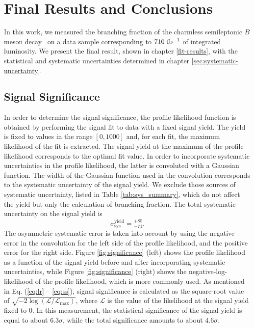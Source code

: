 \chapter{Final Results and Conclusions}\label{sec:results}

In this work, we measured the branching fraction of the charmless semileptonic $B$ meson decay \decayb~on a data sample corresponding to $710\mathrm{~fb^{-1}}$ of integrated luminosity. We present the final result, shown in chapter \ref{fit-results}, with the statistical and systematic uncertainties determined in chapter \ref{sec:systematic-uncertainty}.

\section{Signal Significance}

In order to determine the signal significance, the profile likelihood function is obtained by performing the signal fit to data with a fixed signal yield. The yield is fixed to values in the range $[0, 1000]$ and, for each fit, the maximum likelihood of the fit is extracted. The signal yield at the maximum of the profile likelihood corresponds to the optimal fit value. In order to incorporate systematic uncertainties in the profile likelihood, the latter is convoluted with a Gaussian function. The width of the Gaussian function used in the convolution corresponds to the systematic uncertainty of the signal yield. We exclude those sources of systematic uncertainty, listed in Table \ref{tab:sys_summary}, which do not affect the yield but only the calculation of branching fraction. The total systematic uncertainty on the signal yield is
\begin{equation}
\sigma_{\mathrm{sys}}^{\mathrm{yield}} = {}_{-71}^{+85}.
\end{equation}
The asymmetric systematic error is taken into account by using the negative error in the convolution for the left side of the profile likelihood, and the positive error for the right side. Figure \ref{fig:significance} (left) shows the profile likelihood as a function of the signal yield before and after incorporating systematic uncertainties, while Figure \ref{fig:significance} (right) shows the negative-log-likelihood of the profile likelihood, which is more commonly used. As mentioned in Eq. (\ref{eq:lr} -- \ref{eq:ss}), signal significance is calculated as the square-root value of $\sqrt{-2\log(\mathcal{L}/\mathcal{L}_{\mathrm{max}})}$, where $\mathcal{L}$ is the value of the likelihood at the signal yield fixed to 0. In this measurement, the statistical significance of the signal yield is equal to about $6.3\sigma$, while the total significance amounts to about $4.6\sigma$.

